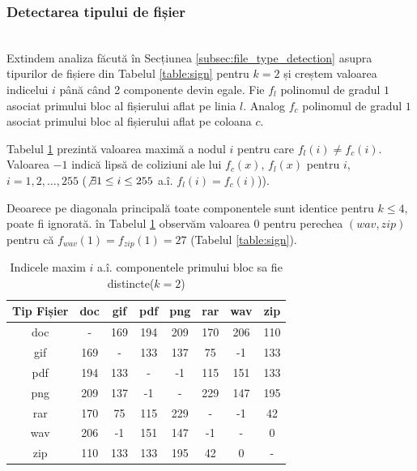 \documentclass[oneside, 12pt]{book}
\begin{document}

\subsubsection{Detectarea tipului de fișier}\hspace*{\fill} \\

Extindem analiza făcută în Secțiunea {\ref{subsec:file_type_detection}} asupra tipurilor de fișiere din Tabelul {\ref{table:sign}} pentru $k = 2$ și creștem valoarea indicelui $i$ până când 2 componente devin egale. Fie $f_l$ polinomul de gradul $1$ asociat primului bloc al fișierului aflat pe linia $l$. Analog $f_c$ polinomul de gradul $1$ asociat primului bloc al fișierului aflat pe coloana $c$.

Tabelul {\ref{table:k2} prezintă} valoarea maximă a nodul $i$ pentru care $f_l(i) \neq f_c(i)$. Valoarea $-1$ indică lipsă de coliziuni ale lui $f_c(x)$, $f_l(x)$ pentru $i$, $i = {1,2,\dots,255}$ ($\not\exists 1 \leq i \leq 255$ a.î. $f_l(i) = f_c(i)$)).

Deoarece pe diagonala principală toate componentele sunt identice pentru $k \leq 4$, poate fi ignorată. în Tabelul {\ref{table:k2}} observăm valoarea $0$ pentru perechea $(wav, zip)$ pentru că $f_{wav}(1) = f_{zip}(1) = 27$ (Tabelul \ref{table:sign}).



\begin{table}[b]
\begin{center}
\caption{Indicele maxim $i$ a.î. componentele primului bloc sa fie distincte($k=2$)}\label{tb:margins}
\label{table:k2}
\begin{tabular}{cccccccc}
Tip Fișier & doc & gif & pdf & png & rar & wav & zip \\\hline
  doc & - & 169 & 194 & 209 & 170 & 206 & 110\\
  gif & 169 & - & 133 & 137 & 75 & -1 & 133\\
  pdf & 194 & 133 & - & -1 & 115 & 151 & 133\\
  png & 209 & 137 & -1 & - & 229 & 147 & 195\\
  rar & 170 & 75 & 115 & 229 & - & -1 & 42\\
  wav & 206 & -1 & 151 & 147 & -1 & - & 0\\
  zip & 110 & 133 & 133 & 195 & 42 & 0 & -\\ \hline
\end{tabular}
\end{center}
\end{table}
\end{document}
